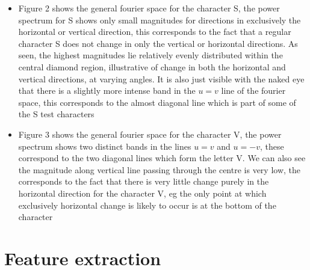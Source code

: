 \documentclass[a4paper,12px,twocolumn]{article}
\begin{document}
\begin{flushleft}
{\begin{itemize}
    \item Figure 2 shows the general fourier space for the character S, the power spectrum for S shows only small magnitudes for directions
    in exclusively the horizontal or vertical direction, this corresponds to the fact that a regular character S does not change in only
    the vertical or horizontal directions. As seen, the highest magnitudes lie relatively evenly distributed within the central diamond
    region, illustrative of change in both the horizontal and vertical directions, at varying angles. It is also just visible with the naked eye
    that there is a slightly more intense band in the $u=v$ line of the fourier space, this corresponds to the almost diagonal line which is part
    of some of the S test characters

    \item Figure 3 shows the general fourier space for the character V, the power spectrum shows two distinct bands in the lines $u = v$ and $u=-v$,
    these correspond to the two diagonal lines which form the letter V. We can also see the magnitude along vertical line
    passing through the centre is very low, the corresponds to the fact that there is very little change purely in the horizontal direction for the
    character V, eg the only point at which exclusively horizontal change is likely to occur is at the bottom of the character

\end{itemize}
}

\section{Feature extraction}
\end{flushleft}
\end{document}
